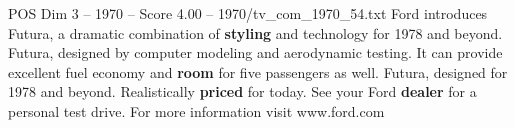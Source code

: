 \begin{textsample}{POS Dim 3 – 1970 – Score 4.00 – 1970/tv\_com\_1970\_54.txt}  \label{ex:f3_pos_032}
Ford introduces Futura, a dramatic combination of \textbf{styling} and technology for 1978 and beyond.
Futura, designed by computer modeling and aerodynamic testing.
It can provide excellent fuel economy and \textbf{room} for five passengers as well.
Futura, designed for 1978 and beyond.
Realistically \textbf{priced} for today.
See your Ford \textbf{dealer} for a personal test drive.
For more information visit www.ford.com

\end{textsample}

